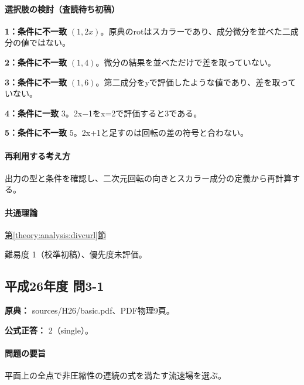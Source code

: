 \paragraph{選択肢の検討（査読待ち初稿）}\mbox{}\par

\noindent\textbf{1：条件に不一致} \((1,2x)\)。原典のrotはスカラーであり、成分微分を並べた二成分の値ではない。\par

\noindent\textbf{2：条件に不一致} \((1,4)\)。微分の結果を並べただけで差を取っていない。\par

\noindent\textbf{3：条件に不一致} \((1,6)\)。第二成分をyで評価したような値であり、差を取っていない。\par

\noindent\textbf{4：条件に一致} \(3\)。2x−1をx=\allowbreak{}2で評価すると3である。\par

\noindent\textbf{5：条件に不一致} \(5\)。2x+1と足すのは回転の差の符号と合わない。\par

\paragraph{再利用する考え方} 出力の型と条件を確認し、二次元回転の向きとスカラー成分の定義から再計算する。

\paragraph{共通理論} \hyperref[theory:analysis:divcurl]{第\ref*{theory:analysis:divcurl}節}

\par 難易度 1（校準初稿）、優先度未評価。

\subsection{平成26年度 問3-1}
\label{q:h26-reg-basic-3-1}

\noindent\textbf{原典：} sources/H26/basic.pdf、PDF物理9頁。

\textbf{公式正答：} 2（single）。

\paragraph{問題の要旨} 平面上の全点で非圧縮性の連続の式を満たす流速場を選ぶ。

